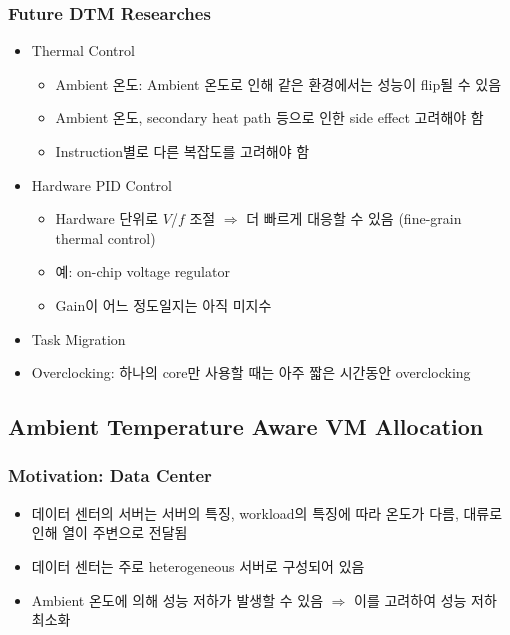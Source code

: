 \subsubsection*{Future DTM Researches}
\begin{itemize}
    \item Thermal Control
    \begin{itemize}
        \item Ambient 온도: Ambient 온도로 인해 같은 환경에서는 성능이 flip될 수 있음
        \item Ambient 온도, secondary heat path 등으로 인한 side effect 고려해야 함
        \item Instruction별로 다른 복잡도를 고려해야 함
    \end{itemize}
    \item Hardware PID Control
    \begin{itemize}
        \item Hardware 단위로 $V$/$f$ 조절 $\Rightarrow$ 더 빠르게 대응할 수 있음 (fine-grain thermal control)
        \item 예: on-chip voltage regulator
        \item Gain이 어느 정도일지는 아직 미지수
    \end{itemize}
    \item Task Migration
    \item Overclocking: 하나의 core만 사용할 때는 아주 짧은 시간동안 overclocking
\end{itemize}

\subsection{Ambient Temperature Aware VM Allocation}

\subsubsection*{Motivation: Data Center}
\begin{itemize}
    \item 데이터 센터의 서버는 서버의 특징, workload의 특징에 따라 온도가 다름, 대류로 인해 열이 주변으로 전달됨
    \item 데이터 센터는 주로 heterogeneous 서버로 구성되어 있음
    \item Ambient 온도에 의해 성능 저하가 발생할 수 있음 $\Rightarrow$ 이를 고려하여 성능 저하 최소화
\end{itemize}

